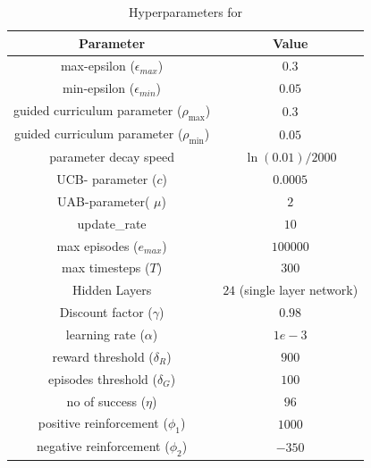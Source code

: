% 
\begin{table}[h]
\begin{center}
\small
\begin{tabular}{@{}cc@{}}
 \arrayrulecolor{taupegray}\toprule
    \textbf{Parameter} & \textbf{Value} \\ \midrule
    max-epsilon ($\epsilon_{max}$) & $0.3$ \\ \midrule
    min-epsilon ($\epsilon_{min}$) & $0.05$ \\ \midrule
    guided curriculum parameter ($\rho_{\text{max}}$) & $0.3$ \\ \midrule
    guided curriculum parameter ($\rho_{\text{min}}$) & $0.05$ \\ \midrule
    parameter decay speed & $\ln(0.01)/2000$ \\ \midrule
    UCB- parameter ($c$) & $0.0005$ \\ \midrule
    UAB-parameter( $\mu$) &$2$  \\ \midrule
    update\_rate & $10$ \\ \midrule
    max episodes ($e_{max}$) & $100000$ \\ \midrule
    max timesteps ($T$) & $300$ \\ \midrule
    Hidden Layers & $24$ (single layer network) \\ \midrule
    Discount factor ($\gamma$) & $0.98$ \\ \midrule
    learning rate ($\alpha$) & $1e-3$ \\ \midrule
    reward threshold ($\delta_{R}$) & $900$ \\ \midrule
    episodes threshold ($\delta_{G}$) & $100$ \\ \midrule
    no of success ($\eta$) & $96$ \\ \midrule
    positive reinforcement ($\phi_1$) & $1000$ \\ \midrule
    negative reinforcement ($\phi_2$) & $-350$ \\ \midrule
\end{tabular}
\end{center}
\caption{Hyperparameters for \RAPidLearn{}}
\label{tab:hyper_rapid}
\end{table}
% 